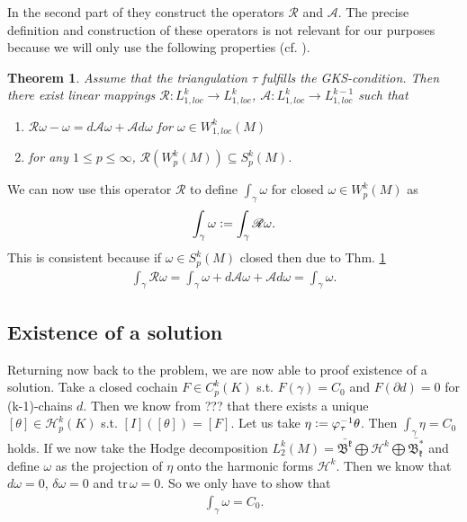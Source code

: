 \documentclass[12pt,a4paper]{article}
\newtheorem{theorem}{Theorem}
\newcommand{\rop}{\mathscr{R}} %
\begin{document}
In the second part of \cite{goldshtein} they construct the operators
$\mathscr{R}$ and $\mathscr{A}$. The precise definition and construction of
these operators is not relevant for our purposes because we will only use
the following properties (cf. \cite[Thm.2]{goldshtein}).

\begin{theorem}\label{operators}
    Assume that the triangulation $\tau$ fulfills the GKS-condition.
    Then there exist linear mappings $\mathscr{R}: L^k_{1,loc} \rightarrow 
    L^k_{1,loc}$, $\mathscr{A}: L^k_{1,loc} \rightarrow L^{k-1}_{1,loc}$ 
    such that
    \begin{enumerate}
        \item $\mathscr{R}\omega - \omega = 
            d\mathscr{A}\omega + \mathscr{A}d\omega$ for 
            $\omega \in W^k_{1,loc}(M)$
        \item for any $1 \leq p \leq \infty$, 
            $\rop(W^k_p(M)) \subseteq S^k_p(M)$.
    \end{enumerate}
\end{theorem}

We can now use this operator $\rop$ to define $\int_\gamma \omega$ for closed
$\omega \in W^k_p(M)$ as
\begin{align*}
\int_\gamma \omega \vcentcolon= \int_\gamma \rop\omega.
\end{align*}
This is consistent because if $\omega \in S^k_p(M)$ closed then due to 
Thm. \ref{operators}
\begin{align*}
\int_\gamma \rop\omega = 
\int_\gamma \omega + d\mathscr{A}\omega + \mathscr{A}d\omega = 
\int_\gamma \omega.
\end{align*}

\subsection{Existence of a solution}

Returning now back to the problem, we are now able to proof existence of a 
solution. Take a closed cochain $F \in C^k_p(K)$ s.t. $F(\gamma) = C_0$ and 
$F(\partial d) = 0$ for (k-1)-chains $d$. Then we know from ??? that 
there exists a unique $[\theta] \in \mathscr{H}_p^k(K)$ s.t. 
$[I]([\theta]) = [F]$. Let us take $\eta \vcentcolon= 
\varphi_\tau^{-1} \theta$. Then $\int_\gamma \eta = C_0$ holds. If we now take
the Hodge decomposition
$L^k_2(M) = \bar{\mathfrak{B^k}} \bigoplus \mathcal{H}^k \bigoplus
\bar{\mathfrak{B^*_k}}$ and define $\omega$ as the projection of $\eta$ onto the
harmonic forms $\mathcal{H}^k$. Then we know that $d\omega = 0$, 
$\delta\omega = 0$ and $\text{tr}\,\omega = 0$. So we only have to show that
\begin{align*}
\int_\gamma \omega = C_0.
\end{align*}
\end{document}
